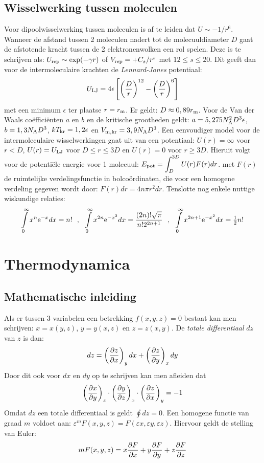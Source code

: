 \documentclass[twoside]{report}
\begin{document}
\section{Wisselwerking tussen moleculen}
Voor dipoolwisselwerking tussen moleculen is af te leiden dat $U\sim-1/r^6$.
Wanneer de afstand tussen 2 moleculen nadert tot de molecuuldiameter $D$
gaat de afstotende kracht tussen de 2 elektronenwolken een rol spelen. Deze
is te schrijven als: $U_{\rm rep}\sim\exp(-\gamma r)$ of
$V_{\rm rep}=+C_s/r^s$ met $12\leq s\leq20$. Dit geeft dan voor de
intermoleculaire krachten de {\it Lennard-Jones} potentiaal:
\[
U_{\rm LJ}=4\epsilon\left[\left(\frac{D}{r}\right)^{12}-\left(\frac{D}{r}\right)^6\right]
\]
met een minimum $\epsilon$ ter plaatse $r=r_{\rm m}$. Er geldt:
$D\approx0,89r_{\rm m}$. Voor de Van der Waals co\"effici\"enten $a$ en $b$
en de kritische grootheden geldt: $a=5,275 N_{\rm A}^2D^3\epsilon$,
$b=1,3N_{\rm A}D^3$, $kT_{\rm kr}=1,2\epsilon$ en
$V_{\rm m,kr}=3,9N_{\rm A}D^3$.
\npar
Een eenvoudiger model voor de intermoleculaire wisselwerkingen gaat uit van
een potentiaal: $U(r)=\infty$ voor $r<D$, $U(r)=U_{\rm LJ}$ voor $D\leq
r\leq3D$ en $U(r)=0$ voor $r\geq3D$. Hieruit volgt voor de potenti\"ele
energie voor 1 molecuul: $\displaystyle E_{\rm pot}=\int_D^{3D}U(r)F(r)dr$.
\npar
met $F(r)$ de ruimtelijke verdelingsfunctie in bolco\"ordinaten, die voor een
homogene verdeling gegeven wordt door: $F(r)dr=4n\pi r^2dr$.
\npar
Tenslotte nog enkele nuttige wiskundige relaties:
\[
\int\limits_0^\infty x^n{\rm e}^{-x}dx=n!~~,~~
\int\limits_0^\infty x^{2n}{\rm e}^{-x^2}dx=\frac{(2n)!\sqrt{\pi}}{n!2^{2n+1}}~~,~~
\int\limits_0^\infty x^{2n+1}{\rm e}^{-x^2}dx=\mbox{$\frac{1}{2}$} n!
\]

\chapter{Thermodynamica}
\section{Mathematische inleiding}
Als er tussen 3 variabelen een betrekking $f(x,y,z)=0$ bestaat kan men
schrijven: $x=x(y,z)$, $y=y(x,z)$ en $z=z(x,y)$. De {\it totale differentiaal}
$dz$ van $z$ is dan:
\[
dz=\left(\frac{\partial z}{\partial x}\right)_{y}dx+\left(\frac{\partial z}{\partial y}\right)_{x}dy
\]
Door dit ook voor $dx$ en $dy$ op te schrijven kan men afleiden dat
\[
\left(\frac{\partial x}{\partial y}\right)_{z}\cdot\left(\frac{\partial y}{\partial z}\right)_{x}\cdot\left(\frac{\partial z}{\partial x}\right)_{y}=-1
\]
Omdat $dz$ een totale differentiaal is geldt $\oint dz=0$.
\npar
Een homogene functie van graad $m$ voldoet aan:
$\varepsilon^m F(x,y,z)=F(\varepsilon x,\varepsilon y,\varepsilon z)$.
Hiervoor geldt de stelling van Euler:
\[
mF(x,y,z)=x\frac{\partial F}{\partial x}+y\frac{\partial F}{\partial y}+z\frac{\partial F}{\partial z}
\]
\end{document}
